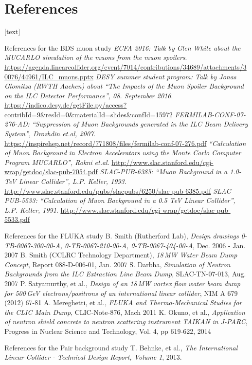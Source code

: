 \documentclass[xcolor={dvipsnames}]{beamer}
\begin{document}
\section*{References}
\begin{thebibliography}{9}
[text]
\begin{frame}{References for the BDS muon study}
\tiny
{}  \emph{ECFA 2016: Talk by Glen White about the MUCARLO simulation of the muons from the muon spoilers}. \url{https://agenda.linearcollider.org/event/7014/contributions/34689/attachments/30076/44961/ILC_muons.pptx}
  \emph{DESY summer student program: Talk by Jonas Glomitza (RWTH Aachen) about ``The Impacts of the Muon Spoiler Background on the ILC Detector Performance'', 08. September 2016}. \url{https://indico.desy.de/getFile.py/access?contribId=9&resId=0&materialId=slides&confId=15972}
  \emph{FERMILAB-CONF-07-276-AD: ``Suppression of Muon Backgrounds generated in the ILC Beam Delivery System'', Drozhdin et.al, 2007}. \url{https://inspirehep.net/record/771808/files/fermilab-conf-07-276.pdf}
  \emph{``Calculation of Muon Background in Electron Accelerators using the Monte Carlo Computer Program MUCARLO'', Rokni et.al}. \url{http://www.slac.stanford.edu/cgi-wrap/getdoc/slac-pub-7054.pdf}
  \emph{SLAC-PUB-6385: ``Muon Background in a 1.0-TeV Linear Collider'', L.P. Keller, 1993}. \url{http://www.slac.stanford.edu/pubs/slacpubs/6250/slac-pub-6385.pdf}
  \emph{SLAC-PUB-5533: ``Calculation of Muon Background in a 0.5 TeV Linear Collider'', L.P. Keller, 1991}. \url{http://www.slac.stanford.edu/cgi-wrap/getdoc/slac-pub-5533.pdf}
\end{frame}
\begin{frame}{References for the FLUKA study}
\tiny
{} B. Smith (Rutherford Lab), \emph{Design drawings 0-TB-0067-300-00-A, 0-TB-0067-210-00-A, 0-TB-0067-404-00-A}, Dec. 2006 - Jan. 2007
 B. Smith (CCLRC Technology Department), \emph{18\,MW Water Beam Dump Concept}, Report 088-D-006-01, Jan. 2007
 S. Darbha, \emph{Simulation of Neutron Backgrounds from the ILC Extraction Line Beam Dump}, SLAC-TN-07-013, Aug. 2007
 P. Satyamurthy, et al., \emph{Design of an 18\,MW vortex flow water beam dump for 500\,GeV electrons/positrons of an international linear collider}, NIM A 679 (2012) 67-81
 A. Mereghetti, et al., \emph{FLUKA and Thermo-Mechanical Studies for the CLIC Main Dump}, CLIC-Note-876, Mach 2011
 K. Okuno, et al., \emph{Application of neutron shield concrete to neutron scattering instrument TAIKAN in J-PARC}, Progress in Nuclear Science and Technology, Vol. 4, pp 619-622, 2014
\end{frame}
\begin{frame}{References for the Pair background study}
\tiny
{} T. Behnke, et al., \emph{The International Linear Collider - Technical Design Report, Volume 1}, 2013.
\end{frame}
\end{thebibliography}
\end{document}
